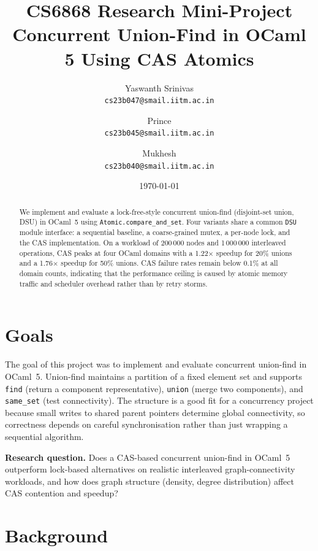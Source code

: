 \documentclass[11pt,a4paper]{article}
\title{%
  \textbf{CS6868 Research Mini-Project} \\[0.3em]
  \Large Concurrent Union-Find in OCaml 5 Using CAS Atomics%
}
\author{%
  Yaswanth Srinivas \\ \texttt{cs23b047@smail.iitm.ac.in}
  \and
  Prince \\ \texttt{cs23b045@smail.iitm.ac.in}
  \and
  Mukhesh \\ \texttt{cs23b040@smail.iitm.ac.in}
}
\date{\today}
\begin{document}
\maketitle

\begin{abstract}
We implement and evaluate a lock-free-style concurrent union-find (disjoint-set
union, DSU) in OCaml~5 using \texttt{Atomic.compare\_and\_set}.  Four variants
share a common \texttt{DSU} module interface: a sequential baseline, a
coarse-grained mutex, a per-node lock, and the CAS implementation.
On a workload of 200\,000 nodes and 1\,000\,000 interleaved operations, CAS
peaks at four OCaml domains with a 1.22$\times$ speedup for 20\% unions and a
1.76$\times$ speedup for 50\% unions.  CAS failure rates remain below 0.1\% at
all domain counts, indicating that the performance ceiling is caused by atomic
memory traffic and scheduler overhead rather than by retry storms.
\end{abstract}

\section{Goals}
\label{sec:goals}

The goal of this project was to implement and evaluate concurrent union-find in
OCaml~5.  Union-find maintains a partition of a fixed element set and supports
\texttt{find} (return a component representative), \texttt{union} (merge two
components), and \texttt{same\_set} (test connectivity).  The structure is a
good fit for a concurrency project because small writes to shared parent
pointers determine global connectivity, so correctness depends on careful
synchronisation rather than just wrapping a sequential algorithm.

\textbf{Research question.} Does a CAS-based concurrent union-find in OCaml~5
outperform lock-based alternatives on realistic interleaved graph-connectivity
workloads, and how does graph structure (density, degree distribution) affect
CAS contention and speedup?
\section{Background}
\label{sec:background}
\end{document}
